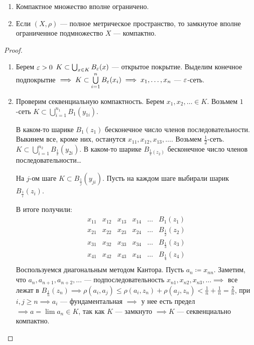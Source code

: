 \begin{theorem}[Хаусдорфа]
    \begin{enumerate}
        \item Компактное множество вполне ограничено.
        \item Если $(X, \rho)$ --- полное метрическое пространство, то замкнутое вполне ограниченное подмножество  $X$ --- компактно.
    \end{enumerate}
\end{theorem}
\begin{proof}
    \begin{enumerate}
        \item Берем $\varepsilon > 0$  $K \subset \bigcup_{x \in K} B_\varepsilon(x)$ --- открытое покрытие. Выделим конечное подпокрытие  $\implies K \subset \bigcup\limits_{i=1}^n B_\varepsilon(x_i) \implies x_1, \ldots, x_n$  --- $\varepsilon$-сеть.
        \item Проверим секвенциальную компактность. Берем  $x_1, x_2, \ldots \in K$. Возьмем $1$-сеть  $K \subset \bigcup_{i=1}^{n_1} B_1(y_{1i})$.

            В каком-то шарике $B_1(z_1)$ бесконечное число членов последовательности. Выкинем все, кроме них, останутся  $x_{11}, x_{12}, x_{13},\ldots$. Возьмем $\frac{1}{2}$-сеть. $K \subset \bigcup\limits_{i=1}^{n_2} B_{\frac{1}{2}}(y_{2i})$. В каком-то шарике $B_{\frac{1}{2}(z_2)}$ бесконечное число членов последовательности\dots

            На $j$-ом шаге  $K \subset B_{\frac{1}{j}}(y_{ji})$. Пусть на каждом шаге выбирали шарик $B_{\frac{1}{i}}(z_i)$.

            В итоге получили:
            \[
            \begin{array}{cccccc}
                x_{11} & x_{12} & x_{13} & x_{14} & \ldots & B_1(z_1)\\
                x_{21} & x_{22} & x_{23} & x_{24} & \ldots & B_{\frac{1}{2}}(z_2)\\
                x_{31} & x_{32} & x_{33} & x_{34} & \ldots & B_{\frac{1}{3}}(z_3)\\
                x_{41} & x_{42} & x_{43} & x_{44} & \ldots & B_{\frac{1}{4}}(z_4)\\
            \end{array}            \] 
            Воспользуемся диагональным методом Кантора. Пусть $a_n \coloneqq x_{nn}$. Заметим, что  $a_n, a_{n+1}, a_{n+2},\ldots$ --- подпоследовательность  $x_{n1}, x_{n 2}, x_{n 3},\ldots \implies$ все лежат в $B_{\frac{1}{n}}(z_n) \implies \rho(a_i, a_j) \le \rho(a_i, z_n) + \rho(a_j, z_n) < \frac{1}{n} + \frac{1}{n} = \frac{2}{n}$, при $i, j \ge n \implies a_i$ --- фундаментальная $\implies$ у нее есть предел  $\implies a = \lim a_n \in K$,  так как $K$ --- замкнуто $\implies K$ --- секвенциально компактно.
    \end{enumerate}
\end{proof}
